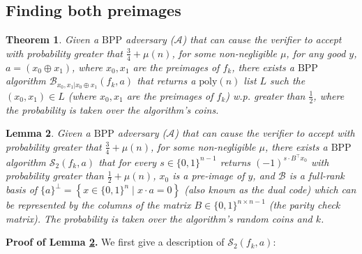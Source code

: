 \documentclass{article}
\newtheorem{thm}{Theorem}
\newtheorem{lem}[thm]{Lemma}
\begin{document}
\subsection{Finding both preimages}
\begin{thm}
\label{fullrecovery}
Given a $\mathrm{BPP}$ adversary ($\mathcal{A}$) that can cause the verifier to accept with probability greater that $\frac{3}{4}+\mu(n)$, for some non-negligible $\mu$, for any good $y$, $a=(x_{0}\oplus x_{1})$, where $x_{0}, x_{1}$ are the preimages of $f_{k}$, there exists a $\mathrm{BPP}$ algorithm $\mathcal{B}_{x_{0},x_{1}|x_{0}\oplus x_{1}}(f_{k}, a)$ that returns a $\mathrm{poly}(n)$ list $L$ such the $(x_{0}, x_{1})\in L$ (where $x_{0}, x_{1}$ are the preimages of $f_{k}$) w.p. greater than $\frac{1}{2}$, where the probability is taken over the algorithm's coins.
\end{thm}


\begin{lem}
\label{lemmas2}
Given a $\mathrm{BPP}$ adversary ($\mathcal{A}$) that can cause the verifier to accept with probability greater that $\frac{3}{4}+\mu(n)$, for some non-negligible $\mu$, there exists a $\mathrm{BPP}$ algorithm $\mathcal{S}_{2}(f_{k}, a)$ that for every $s\in\{0,1\}^{n-1}$ returns $(-1)^{s\cdot B^{\top}x_{0}}$ with probability greater than $\frac{1}{2}+\mu(n)$,  $x_{0}$ is a pre-image of $y$, and 
$\mathcal{B}$ is a full-rank basis of $\{a\}^{\perp} = \left\{x\in\{0,1\}^{n}\mid x\cdot a = 0\right\}$ (also known as the dual code) which can be represented by the columns of the matrix $B\in\{0,1\}^{n\times n-1}$ (the parity check matrix). The probability is taken over the algorithm's random coins and $k$.
\end{lem}
\textbf{Proof of Lemma \ref{lemmas2}.} We first give a description of $\mathcal{S}_{2}(f_{k}, a)$:
\end{document}
